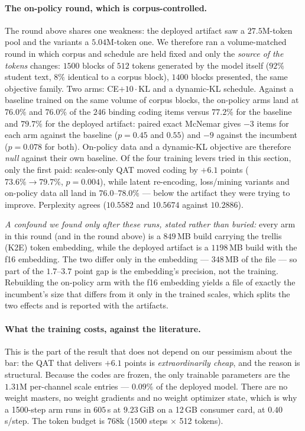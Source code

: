 \documentclass[11pt,a4paper]{article}
\begin{document}
\paragraph{The on-policy round, which is corpus-controlled.} The round above shares one weakness: the
deployed artifact saw a $27.5$M-token pool and the variants a $5.04$M-token one. We therefore ran a
volume-matched round in which corpus and schedule are held fixed and only the \emph{source of the
tokens} changes: $1500$ blocks of $512$ tokens generated by the model itself ($92\%$ student text,
$8\%$ identical to a corpus block), $1400$ blocks presented, the same objective family. Two arms:
CE$+10\cdot$KL and a dynamic-KL schedule. Against a baseline trained on the same volume of corpus
blocks, the on-policy arms land at $76.0\%$ and $76.0\%$ of the $246$ binding coding items versus
$77.2\%$ for the baseline and $79.7\%$ for the deployed artifact: paired exact McNemar gives $-3$
items for each arm against the baseline ($p=0.45$ and $0.55$) and $-9$ against the incumbent
($p=0.078$ for both). On-policy data and a dynamic-KL objective are therefore \emph{null} against
their own baseline. Of the four training levers tried in this section, only the first paid:
scales-only QAT moved coding by $+6.1$ points ($73.6\%\to79.7\%$, $p=0.004$), while latent
re-encoding, loss/mining variants and on-policy data all land in $76.0$--$78.0\%$ --- below the
artifact they were trying to improve. Perplexity agrees ($10.5582$ and $10.5674$ against $10.2886$).

\emph{A confound we found only after these runs, stated rather than buried:} every arm in this
round (and in the round above) is a $849$\,MB build carrying the trellis (K2E) token embedding,
while the deployed artifact is a $1198$\,MB build with the f16 embedding. The two differ only in the
embedding --- $348$\,MB of the file --- so part of the $1.7$--$3.7$ point gap is the embedding's
precision, not the training. Rebuilding the on-policy arm with the f16 embedding yields a file of
exactly the incumbent's size that differs from it only in the trained scales, which splits the two
effects and is reported with the artifacts.

\paragraph{What the training costs, against the literature.} This is the part of the result that
does not depend on our pessimism about the bar: the QAT that delivers $+6.1$ points is
\emph{extraordinarily cheap}, and the reason is structural. Because the codes are frozen, the only
trainable parameters are the $1.31$M per-channel scale entries --- $0.09\%$ of the deployed model.
There are no weight masters, no weight gradients and no weight optimizer state, which is why a
1500-step arm runs in $605$\,s at $9.23$\,GiB on a 12\,GB consumer card, at $0.40$\,s/step.
The token budget is $768$k ($1500$ steps $\times$ 512 tokens).
\end{document}
